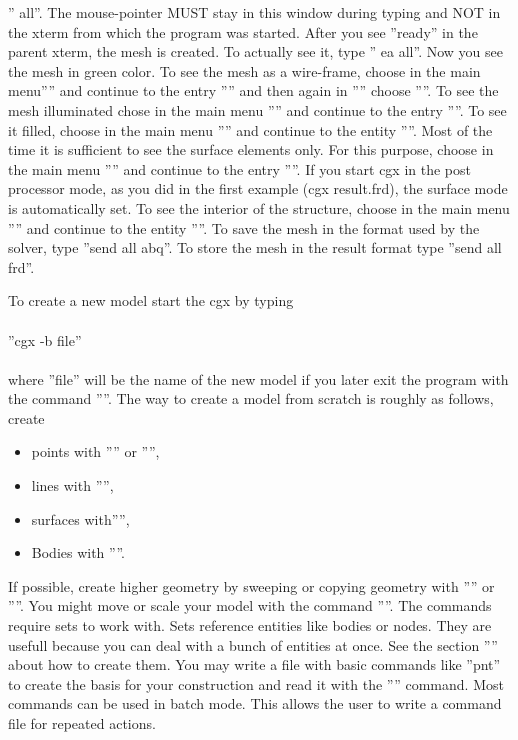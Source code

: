 \documentclass{article}
\begin{document}
'' all''. The mouse-pointer MUST stay in this window during typing and NOT in the xterm from which the program was started. After you see ''ready'' in the parent xterm, the mesh is created. To actually see it, type '' ea all''. Now you see the mesh in green color. To see the mesh as a wire-frame, choose in the main menu'''' and continue to the entry '''' and then again in '''' choose ''''. To see the mesh illuminated chose in the main menu '''' and continue to the entry ''''. To see it filled, choose in the main menu '''' and continue to the entity ''''. Most of the time it is sufficient to see the surface elements only. For this purpose, choose in the main menu '''' and continue to the entry ''''. If you start cgx in the post processor mode, as you did in the first example (cgx result.frd), the surface mode is automatically set. To see the interior of the structure, choose in the main menu '''' and continue to the entity ''''. To save the mesh in the format used by the solver, type ''send all abq''. To store the mesh in the result format type ''send all frd''. 

To create a new model start the cgx by typing\\\\  ''cgx -b file''\\\\where ''file'' will be the name of the new model if you later exit the program with the command ''''. The way to create a model from scratch is roughly as follows, create
\begin{itemize}
\item points with '''' or '''',
\item lines with '''',
\item surfaces with'''',
\item Bodies with ''''.
\end{itemize}
If possible, create higher geometry by sweeping or copying geometry with '''' or ''''. You might move or scale your model with the command ''''. The commands require sets to work with. Sets reference entities like bodies or nodes. They are usefull because you can deal with a bunch of entities at once. See the section '''' about how to create them.
You may write a file with basic commands like ''pnt'' to create the basis for your construction and read it with the '''' command. Most commands can be used in batch mode. This allows the user to write a command file for repeated actions.
\end{document}
